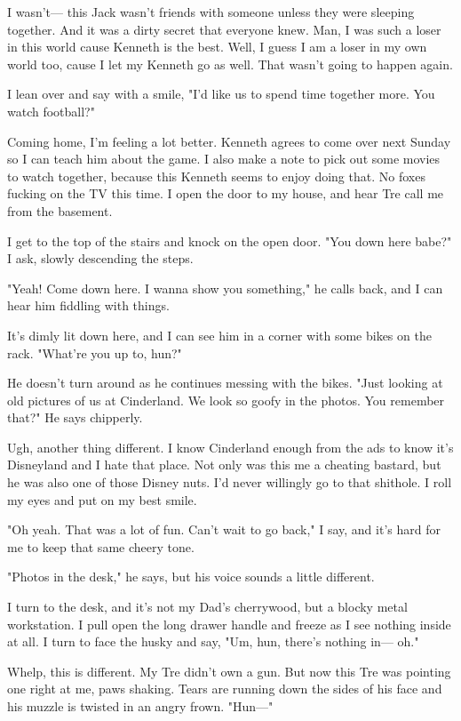 I wasn't--- this Jack wasn't friends with someone unless they were sleeping together. And it was a dirty secret that everyone knew. Man, I was such a loser in this world cause Kenneth is the best. Well, I guess I am a loser in my own world too, cause I let my Kenneth go as well. That wasn't going to happen again.

I lean over and say with a smile, "I'd like us to spend time together more. You watch football?"

Coming home, I'm feeling a lot better. Kenneth agrees to come over next Sunday so I can teach him about the game. I also make a note to pick out some movies to watch together, because this Kenneth seems to enjoy doing that. No foxes fucking on the TV this time. I open the door to my house, and hear Tre call me from the basement.

I get to the top of the stairs and knock on the open door. "You down here babe?" I ask, slowly descending the steps.

"Yeah! Come down here. I wanna show you something," he calls back, and I can hear him fiddling with things.

It's dimly lit down here, and I can see him in a corner with some bikes on the rack. "What're you up to, hun?"

He doesn't turn around as he continues messing with the bikes. "Just looking at old pictures of us at Cinderland. We look so goofy in the photos. You remember that?" He says chipperly.

Ugh, another thing different. I know Cinderland enough from the ads to know it's Disneyland and I hate that place. Not only was this me a cheating bastard, but he was also one of those Disney nuts. I'd never willingly go to that shithole. I roll my eyes and put on my best smile.

"Oh yeah. That was a lot of fun. Can't wait to go back," I say, and it's hard for me to keep that same cheery tone.

"Photos in the desk," he says, but his voice sounds a little different.

I turn to the desk, and it's not my Dad's cherrywood, but a blocky metal workstation. I pull open the long drawer handle and freeze as I see nothing inside at all. I turn to face the husky and say, "Um, hun, there's nothing in--- oh."

Whelp, this is different. My Tre didn't own a gun. But now this Tre was pointing one right at me, paws shaking. Tears are running down the sides of his face and his muzzle is twisted in an angry frown. "Hun---"

